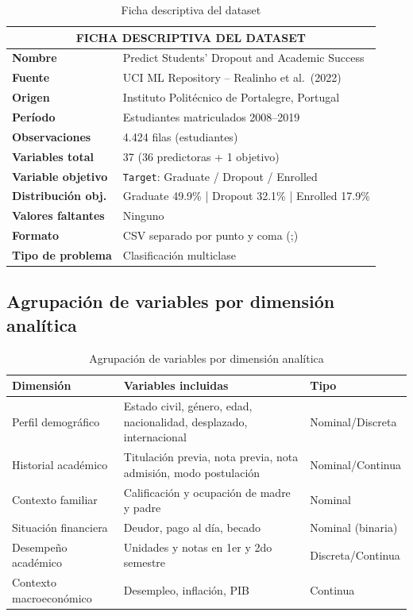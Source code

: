 \documentclass[11pt,a4paper]{article}
\begin{document}
\begin{table}[H]
  \centering
  \colorbox{grisclaro}{%
  \begin{tabular}{p{5cm} p{9cm}}
    \toprule
    \multicolumn{2}{c}{\textbf{FICHA DESCRIPTIVA DEL DATASET}} \\
    \midrule
    \textbf{Nombre}           & Predict Students' Dropout and Academic Success \\
    \textbf{Fuente}           & UCI ML Repository -- Realinho et al.\ (2022) \\
    \textbf{Origen}           & Instituto Politécnico de Portalegre, Portugal \\
    \textbf{Período}          & Estudiantes matriculados 2008--2019 \\
    \textbf{Observaciones}    & 4.424 filas (estudiantes) \\
    \textbf{Variables total}  & 37 (36 predictoras + 1 objetivo) \\
    \textbf{Variable objetivo}& \texttt{Target}: Graduate / Dropout / Enrolled \\
    \textbf{Distribución obj.}& Graduate 49.9\% | Dropout 32.1\% | Enrolled 17.9\% \\
    \textbf{Valores faltantes}& Ninguno \\
    \textbf{Formato}          & CSV separado por punto y coma (;) \\
    \textbf{Tipo de problema} & Clasificación multiclase \\
    \bottomrule
  \end{tabular}%
  }
  \caption{Ficha descriptiva del dataset}
\end{table}

\subsection{Agrupación de variables por dimensión analítica}

\begin{table}[H]
  \centering
  \begin{tabular}{p{4.5cm} p{7cm} p{2.5cm}}
    \toprule
    \textbf{Dimensión} & \textbf{Variables incluidas} & \textbf{Tipo} \\
    \midrule
    Perfil demográfico    & Estado civil, género, edad, nacionalidad, desplazado, internacional & Nominal/Discreta \\
    Historial académico   & Titulación previa, nota previa, nota admisión, modo postulación & Nominal/Continua \\
    Contexto familiar     & Calificación y ocupación de madre y padre & Nominal \\
    Situación financiera  & Deudor, pago al día, becado & Nominal (binaria) \\
    Desempeño académico   & Unidades y notas en 1er y 2do semestre & Discreta/Continua \\
    Contexto macroeconómico & Desempleo, inflación, PIB & Continua \\
    \bottomrule
  \end{tabular}
  \caption{Agrupación de variables por dimensión analítica}
\end{table}
\end{document}
